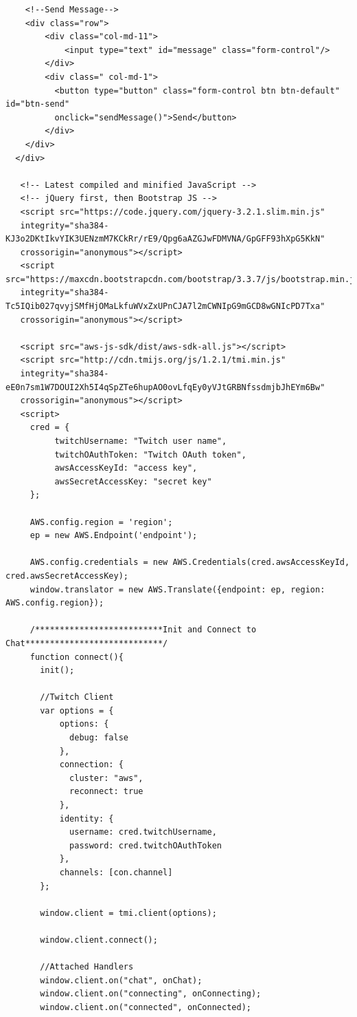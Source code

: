 \documentclass[runningheads]{llncs}
\begin{document}
{\begin{verbatim}
    <!--Send Message-->
    <div class="row">
        <div class="col-md-11">
            <input type="text" id="message" class="form-control"/>
        </div>
        <div class=" col-md-1">
          <button type="button" class="form-control btn btn-default" id="btn-send"
          onclick="sendMessage()">Send</button>
        </div>
    </div>
  </div>

   <!-- Latest compiled and minified JavaScript -->
   <!-- jQuery first, then Bootstrap JS -->
   <script src="https://code.jquery.com/jquery-3.2.1.slim.min.js"
   integrity="sha384-KJ3o2DKtIkvYIK3UENzmM7KCkRr/rE9/Qpg6aAZGJwFDMVNA/GpGFF93hXpG5KkN"
   crossorigin="anonymous"></script>
   <script src="https://maxcdn.bootstrapcdn.com/bootstrap/3.3.7/js/bootstrap.min.js"
   integrity="sha384-Tc5IQib027qvyjSMfHjOMaLkfuWVxZxUPnCJA7l2mCWNIpG9mGCD8wGNIcPD7Txa"
   crossorigin="anonymous"></script>

   <script src="aws-js-sdk/dist/aws-sdk-all.js"></script>
   <script src="http://cdn.tmijs.org/js/1.2.1/tmi.min.js"
   integrity="sha384-eE0n7sm1W7DOUI2Xh5I4qSpZTe6hupAO0ovLfqEy0yVJtGRBNfssdmjbJhEYm6Bw"
   crossorigin="anonymous"></script>
   <script>
     cred = {
          twitchUsername: "Twitch user name",
          twitchOAuthToken: "Twitch OAuth token",
          awsAccessKeyId: "access key",
          awsSecretAccessKey: "secret key"
     };

     AWS.config.region = 'region';
     ep = new AWS.Endpoint('endpoint');

     AWS.config.credentials = new AWS.Credentials(cred.awsAccessKeyId, cred.awsSecretAccessKey);
     window.translator = new AWS.Translate({endpoint: ep, region: AWS.config.region});

     /**************************Init and Connect to Chat****************************/
     function connect(){
       init();

       //Twitch Client
       var options = {
           options: {
             debug: false
           },
           connection: {
             cluster: "aws",
             reconnect: true
           },
           identity: {
             username: cred.twitchUsername,
             password: cred.twitchOAuthToken
           },
           channels: [con.channel]
       };

       window.client = tmi.client(options);

       window.client.connect();

       //Attached Handlers
       window.client.on("chat", onChat);
       window.client.on("connecting", onConnecting);
       window.client.on("connected", onConnected);


\end{verbatim}}
\end{document}
